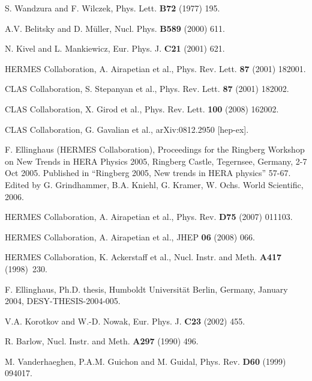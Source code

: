 \begin{thebibliography}{99}
S. Wandzura and F. Wilczek, Phys. Lett. {\bf B72} (1977) 195. 


A.V. Belitsky and D. M\"uller, 
Nucl. Phys. {\bf B589} (2000) 611.


N. Kivel and L. Mankiewicz,
Eur. Phys. J. {\bf C21} (2001) 621.


HERMES Collaboration, A. Airapetian et al., 
Phys. Rev. Lett. {\bf 87} (2001) 182001.


CLAS Collaboration, S. Stepanyan et al., 
Phys. Rev. Lett. {\bf 87} (2001) 182002.


CLAS Collaboration, X. Girod et al., Phys. Rev. Lett. {\bf 100} (2008) 162002. 


CLAS Collaboration, G. Gavalian et al., arXiv:0812.2950 [hep-ex]. 



F. Ellinghaus (HERMES Collaboration),
Proceedings for the Ringberg Workshop on New Trends in HERA Physics 2005, 
Ringberg Castle, Tegernsee, Germany, 2-7 Oct 2005.
Published in ``Ringberg 2005, New trends in HERA physics'' 57-67.
Edited by G. Grindhammer, B.A. Kniehl, G. Kramer, W. Ochs. World Scientific, 2006.


HERMES Collaboration, A. Airapetian et al., Phys. Rev. \textbf{D75} (2007) 011103.


HERMES Collaboration, A. Airapetian et al., JHEP \textbf{06} (2008) 066.


HERMES Collaboration, K. Ackerstaff et al., 
Nucl. Instr. and Meth. {\bf A417} (1998)~230.

F. Ellinghaus, 
Ph.D. thesis, Humboldt Universit\"at Berlin, Germany, January 2004, DESY-THESIS-2004-005.


V.A. Korotkov and W.-D. Nowak,
Eur. Phys. J. {\bf C23} (2002) 455.


R. Barlow,
Nucl. Instr. and Meth. {\bf A297} (1990) 496.


M. Vanderhaeghen, P.A.M. Guichon and M. Guidal, 
Phys. Rev. {\bf D60} (1999) 094017.



\end{thebibliography}
